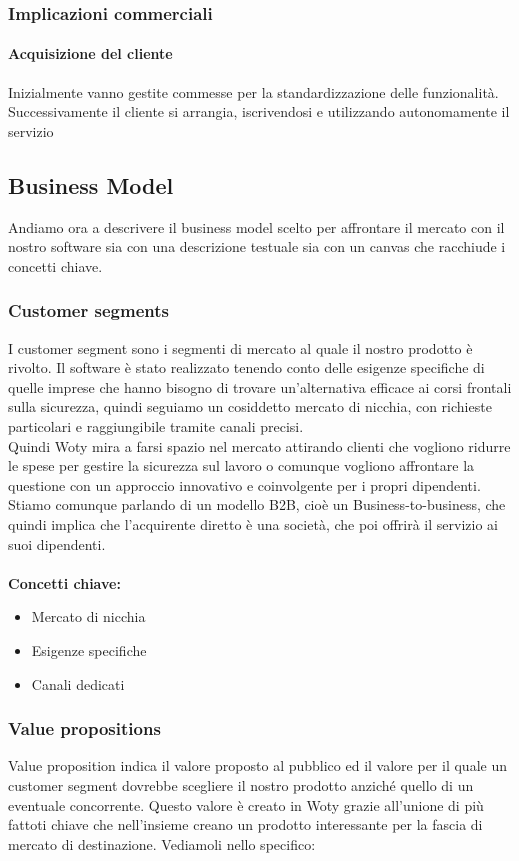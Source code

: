 \subsubsection{Implicazioni commerciali}
\paragraph{Acquisizione del cliente}
Inizialmente vanno gestite commesse per la standardizzazione delle funzionalità. Successivamente il cliente si arrangia, iscrivendosi e utilizzando autonomamente il servizio

\subsection{Business Model}
Andiamo ora a descrivere il business model scelto per affrontare il mercato con il nostro software sia con una descrizione testuale sia con un canvas che racchiude i concetti chiave.

\subsubsection{Customer segments}
I customer segment sono i segmenti di mercato al quale il nostro prodotto è rivolto. Il software è stato realizzato tenendo conto delle esigenze specifiche di quelle imprese che hanno bisogno di trovare un'alternativa efficace ai corsi frontali sulla sicurezza, quindi seguiamo un cosiddetto mercato di nicchia, con richieste particolari e raggiungibile tramite canali precisi. \\
Quindi Woty mira a farsi spazio nel mercato attirando clienti che vogliono ridurre le spese per gestire la sicurezza sul lavoro o comunque vogliono affrontare la questione con un approccio innovativo e coinvolgente per i propri dipendenti. \\
Stiamo comunque parlando di un modello B2B, cioè un Business-to-business, che quindi implica che l'acquirente diretto è una società, che poi offrirà il servizio ai suoi dipendenti.\\
\\ \textbf{Concetti chiave:}
\begin{itemize}
\item Mercato di nicchia
\item Esigenze specifiche
\item Canali dedicati
\end{itemize}

\subsubsection{Value propositions}
Value proposition indica il valore proposto al pubblico ed il valore per il quale un customer segment dovrebbe scegliere il nostro prodotto anziché quello di un eventuale concorrente. Questo valore è creato in Woty grazie all'unione di più fattoti chiave che nell'insieme creano un prodotto interessante per la fascia di mercato di destinazione. Vediamoli nello specifico:

